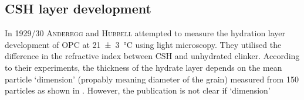 \subsection{\acs*{CSH} layer development}

In 1929/30 \textsc{Anderegg} and \textsc{Hubbell} \cite{anderegg.1929,anderegg.1930} attempted to measure the hydration layer development of \ac{OPC} at \qty{21(3)}{\celsius} using light microscopy.
They utilised the difference in the refractive index between \ac{CSH} and unhydrated clinker.
According to their experiments, the thickness of the hydrate layer depends on the mean particle `dimension' (propably meaning diameter of the grain) measured from \num{150} particles as shown in .
However, the publication is not clear if `dimension'

